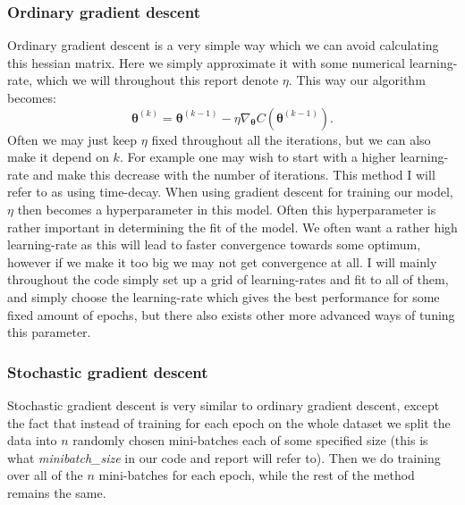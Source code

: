 \documentclass{article}
\begin{document}
\subsubsection{Ordinary gradient descent}
\label{gddesc}
Ordinary gradient descent is a very simple way which we can avoid calculating
this hessian matrix. Here we simply approximate it with some numerical
learning-rate, which we will throughout this report denote $\eta$. This way our
algorithm becomes:
$$\bm{\theta}^{(k)} = \bm{\theta}^{(k-1)} - \eta \nabla_{\bm{\theta}} C(\bm{\theta}^{(k-1)}).$$
Often we may just keep $\eta$  fixed throughout all the iterations, but we can
also make it depend on $k$. For example one may wish to start with a higher
learning-rate and make this decrease with the number of iterations. This method
I will refer to as using time-decay.  When using gradient descent for training
our model, $\eta$ then becomes a hyperparameter in this model. Often this
hyperparameter is rather important in determining the fit of the model. We often
want a rather high learning-rate as this will lead to faster convergence towards
some optimum, however if we make it too big we may not get convergence at all. I
will mainly throughout the code simply set up a grid of learning-rates and fit
to all of them, and simply choose the learning-rate which gives the best
performance for some fixed amount of epochs, but there also exists other more
advanced ways of tuning this parameter.

\subsubsection{Stochastic gradient descent}
\label{sgddesc}
Stochastic gradient descent is very similar to ordinary gradient descent, except
the fact that instead of training for each epoch on the whole dataset we split
the data into $n$ randomly chosen mini-batches each of some specified size (this
is what \textit{minibatch\_size} in our code and report will refer to). Then we
do training over all of the $n$ mini-batches for each epoch, while the rest of
the method remains the same.
\end{document}
